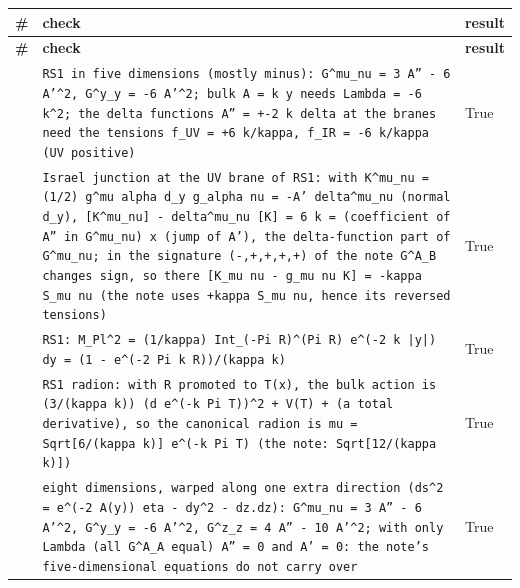 \documentclass[10pt,a4paper]{article}
\begin{document}
{\footnotesize
\begin{longtable}{>{\raggedright\arraybackslash}p{}>{\raggedright\arraybackslash}p{}>{\raggedright\arraybackslash}p{}}
\toprule
\textbf{\#} & \textbf{check} & \textbf{result} \\
\midrule\endfirsthead
\toprule
\textbf{\#} & \textbf{check} & \textbf{result} \\
\midrule\endhead
\endfoot
\bottomrule\endlastfoot
468 & \texttt{RS1 in five dimensions (mostly minus): G\textasciicircum{}mu\_\allowbreak{}nu = 3 A'' - 6 A'\textasciicircum{}2, G\textasciicircum{}y\_\allowbreak{}y = -6 A'\textasciicircum{}2; bulk A = k y needs Lambda = -6 k\textasciicircum{}2; the delta functions A'' = +-2 k delta at the branes need the tensions f\_\allowbreak{}UV = +6 k/\allowbreak{}kappa, f\_\allowbreak{}IR = -6 k/\allowbreak{}kappa (UV positive)} & True \\
469 & \texttt{Israel junction at the UV brane of RS1: with K\textasciicircum{}mu\_\allowbreak{}nu = (1/\allowbreak{}2) g\textasciicircum{}mu alpha d\_\allowbreak{}y g\_\allowbreak{}alpha nu = -A' delta\textasciicircum{}mu\_\allowbreak{}nu (normal d\_\allowbreak{}y), [K\textasciicircum{}mu\_\allowbreak{}nu] - delta\textasciicircum{}mu\_\allowbreak{}nu [K] = 6 k = (coefficient of A'' in G\textasciicircum{}mu\_\allowbreak{}nu) x (jump of A'), the delta-function part of G\textasciicircum{}mu\_\allowbreak{}nu; in the signature (-,+,+,+,+) of the note G\textasciicircum{}A\_\allowbreak{}B changes sign, so there [K\_\allowbreak{}mu nu - g\_\allowbreak{}mu nu K] = -kappa S\_\allowbreak{}mu nu (the note uses +kappa S\_\allowbreak{}mu nu, hence its reversed tensions)} & True \\
470 & \texttt{RS1: M\_\allowbreak{}Pl\textasciicircum{}2 = (1/\allowbreak{}kappa) Int\_\allowbreak{}(-Pi R)\textasciicircum{}(Pi R) e\textasciicircum{}(-2 k |y|) dy = (1 - e\textasciicircum{}(-2 Pi k R))/\allowbreak{}(kappa k)} & True \\
471 & \texttt{RS1 radion: with R promoted to T(x), the bulk action is (3/\allowbreak{}(kappa k)) (d e\textasciicircum{}(-k Pi T))\textasciicircum{}2 + V(T) + (a total derivative), so the canonical radion is mu = Sqrt[6/\allowbreak{}(kappa k)] e\textasciicircum{}(-k Pi T) (the note: Sqrt[12/\allowbreak{}(kappa k)])} & True \\
472 & \texttt{eight dimensions, warped along one extra direction (ds\textasciicircum{}2 = e\textasciicircum{}(-2 A(y)) eta - dy\textasciicircum{}2 - dz.dz): G\textasciicircum{}mu\_\allowbreak{}nu = 3 A'' - 6 A'\textasciicircum{}2, G\textasciicircum{}y\_\allowbreak{}y = -6 A'\textasciicircum{}2, G\textasciicircum{}z\_\allowbreak{}z = 4 A'' - 10 A'\textasciicircum{}2; with only Lambda (all G\textasciicircum{}A\_\allowbreak{}A equal) A'' = 0 and A' = 0: the note's five-dimensional equations do not carry over} & True \\

\end{longtable}}
\end{document}
